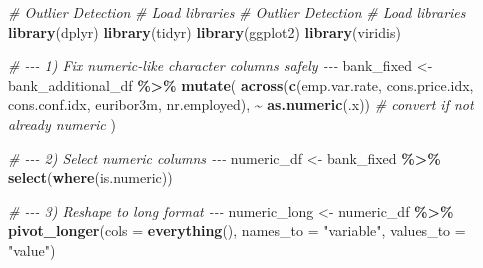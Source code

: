 \documentclass[
]{article}
\newenvironment{Shaded}{\begin{snugshade}}{\end{snugshade}}
\newcommand{\AttributeTok}[1]{\textcolor[rgb]{0.13,0.29,0.53}{#1}}
\newcommand{\CommentTok}[1]{\textcolor[rgb]{0.56,0.35,0.01}{\textit{#1}}}
\newcommand{\FunctionTok}[1]{\textcolor[rgb]{0.13,0.29,0.53}{\textbf{#1}}}
\newcommand{\NormalTok}[1]{#1}
\newcommand{\OtherTok}[1]{\textcolor[rgb]{0.56,0.35,0.01}{#1}}
\newcommand{\SpecialCharTok}[1]{\textcolor[rgb]{0.81,0.36,0.00}{\textbf{#1}}}
\newcommand{\StringTok}[1]{\textcolor[rgb]{0.31,0.60,0.02}{#1}}
\begin{document}
\begin{Shaded}
\begin{Highlighting}[]
\CommentTok{\# Outlier Detection}
\CommentTok{\# Load libraries}
\CommentTok{\# Outlier Detection}
\CommentTok{\# Load libraries}
\FunctionTok{library}\NormalTok{(dplyr)}
\FunctionTok{library}\NormalTok{(tidyr)}
\FunctionTok{library}\NormalTok{(ggplot2)}
\FunctionTok{library}\NormalTok{(viridis)}

\CommentTok{\# {-}{-}{-} 1) Fix numeric{-}like character columns safely {-}{-}{-}}
\NormalTok{bank\_fixed }\OtherTok{\textless{}{-}}\NormalTok{ bank\_additional\_df }\SpecialCharTok{\%\textgreater{}\%}
  \FunctionTok{mutate}\NormalTok{(}
    \FunctionTok{across}\NormalTok{(}\FunctionTok{c}\NormalTok{(emp.var.rate, cons.price.idx, cons.conf.idx, euribor3m, nr.employed),}
           \SpecialCharTok{\textasciitilde{}} \FunctionTok{as.numeric}\NormalTok{(.x))   }\CommentTok{\# convert if not already numeric}
\NormalTok{  )}

\CommentTok{\# {-}{-}{-} 2) Select numeric columns {-}{-}{-}}
\NormalTok{numeric\_df }\OtherTok{\textless{}{-}}\NormalTok{ bank\_fixed }\SpecialCharTok{\%\textgreater{}\%} \FunctionTok{select}\NormalTok{(}\FunctionTok{where}\NormalTok{(is.numeric))}

\CommentTok{\# {-}{-}{-} 3) Reshape to long format {-}{-}{-}}
\NormalTok{numeric\_long }\OtherTok{\textless{}{-}}\NormalTok{ numeric\_df }\SpecialCharTok{\%\textgreater{}\%}
  \FunctionTok{pivot\_longer}\NormalTok{(}\AttributeTok{cols =} \FunctionTok{everything}\NormalTok{(), }\AttributeTok{names\_to =} \StringTok{"variable"}\NormalTok{, }\AttributeTok{values\_to =} \StringTok{"value"}\NormalTok{)}


\end{Highlighting}
\end{Shaded}
\end{document}

